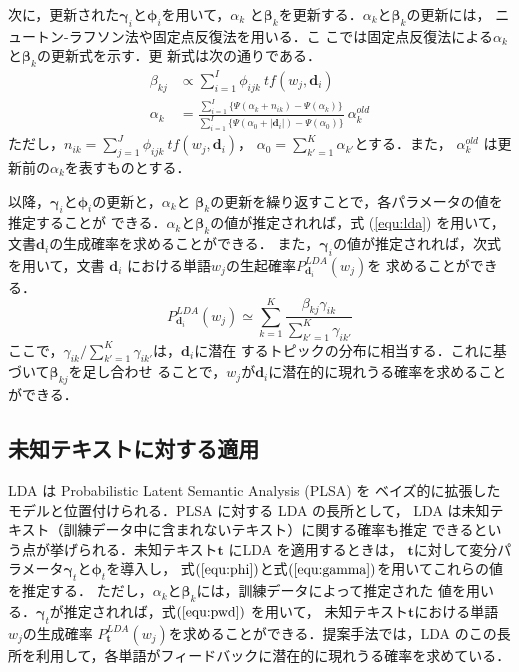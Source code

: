 \documentclass[japanese]{jnlp_1.4}
\begin{document}
次に，更新された$\bm{\gamma}_{i}$と$\bm{\phi}_{i}$を用いて，$\alpha_{k}$
と$\bm{\beta}_{k}$を更新する．$\alpha_{k}$と$\bm{\beta}_{k}$の更新には，
ニュートン-ラフソン法や固定点反復法を用いる\cite{Blei2003,Minka2000}．こ
こでは固定点反復法による$\alpha_{k}$と$\bm{\beta}_{k}$の更新式を示す．更
新式は次の通りである．
\begin{align}
 \beta_{kj}
  & \propto \sum\limits_{i=1}^{I} \phi_{ijk} \  tf(w_{j},\bm{d}_{i})
 \label{equ:beta}
 \\
\alpha_{k}
 & = \frac
 { \sum_{i=1}^{I} \{ \Psi(\alpha_{k} + n_{ik})  - \Psi(\alpha_{k}) \} }
 { \sum_{i=1}^{I} \{ \Psi(\alpha_{0} + |\bm{d}_{i}|) - \Psi(\alpha_{0}) \} } \ \alpha_{k}^{old}
 \label{equ:alpha}
\end{align}
ただし，$n_{ik} = \sum_{j=1}^{J} \phi_{ijk}\ tf(w_{j},\bm{d}_{i})$，
$\alpha_{0} = \sum_{k'=1}^{K} \alpha_{k'}$とする．また，
$\alpha_{k}^{old}$ は更新前の$\alpha_{k}$を表すものとする．

以降，$\bm{\gamma}_{i}$と$\bm{\phi}_{i}$の更新と，$\alpha_{k}$と
$\bm{\beta}_{k}$の更新を繰り返すことで，各パラメータの値を推定することが
できる．$\alpha_{k}$と$\bm{\beta}_{k}$の値が推定されれば，式
(\ref{equ:lda}) を用いて，文書$\bm{d}_{i}$の生成確率を求めることができる．
また，$\bm{\gamma}_{i}$の値が推定されれば，次式を用いて，文書
$\bm{d}_{i}$ における単語$w_{j}$の生起確率$P^{LDA}_{\bm{d}_{i}}(w_{j})$を
求めることができる．
\begin{equation}
 P^{LDA}_{\bm{d}_{i}}(w_{j})
 \simeq
 \sum_{k = 1}^{K}
 \frac{\beta_{kj} \gamma_{ik}}{\sum_{k' = 1}^{K} \gamma_{ik'}}
 \label{equ:pwd}
\end{equation}
ここで，$\gamma_{ik}/\sum_{k'=1}^{K} \gamma_{ik'}$は，$\bm{d}_{i}$に潜在
するトピックの分布に相当する．これに基づいて$\bm{\beta}_{kj}$を足し合わせ
ることで，$w_{j}$が$\bm{d}_{i}$に潜在的に現れうる確率を求めることができる．



\subsection{未知テキストに対する適用} \label{ssec:inference}

LDA は Probabilistic Latent Semantic Analysis (PLSA) \cite{Hofmann1999}を
ベイズ的に拡張したモデルと位置付けられる．PLSA に対する LDA の長所として，
LDA は未知テキスト（訓練データ中に含まれないテキスト）に関する確率も推定
できるという点が挙げられる．未知テキスト$\bm{t}$ にLDA を適用するときは，
$\bm{t}$に対して変分パラメータ$\bm{\gamma}_{t}$と$\bm{\phi}_{t}$を導入し，
式$(\ref{equ:phi})$と式$(\ref{equ:gamma})$を用いてこれらの値を推定する．
ただし，$\alpha_{k}$と$\bm{\beta}_{k}$には，訓練データによって推定された
値を用いる．$\bm{\gamma}_{t}$が推定されれば，式$(\ref{equ:pwd})$ を用いて，
未知テキスト$\bm{t}$における単語$w_{j}$の生成確率
$P_{\bm{t}}^{LDA}(w_{j})$を求めることができる．提案手法では，LDA のこの長
所を利用して，各単語がフィードバックに潜在的に現れうる確率を求めている．
\end{document}
